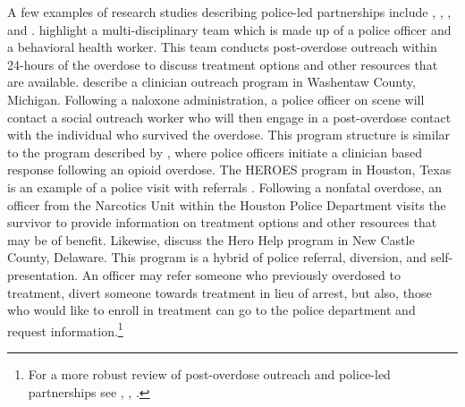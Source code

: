 A few examples of research studies describing police-led partnerships include \textcite{botieri_guide_2016}, \textcite{dahlem_recovery_2021}, \textcite{donnelly_law_2022}, and \textcite{yatsco_alternatives_2020}. \textcite{botieri_guide_2016} highlight a multi-disciplinary team which is made up of a police officer and a behavioral health worker. This team conducts post-overdose outreach within 24-hours of the overdose to discuss treatment options and other resources that are available. \textcite{dahlem_recovery_2021} describe a clinician outreach program in Washentaw County, Michigan. Following a naloxone administration, a police officer on scene will contact a social outreach worker who will then engage in a post-overdose contact with the individual who survived the overdose. This program structure is similar to the program described by \textcite{wagner_training_2016}, where police officers initiate a clinician based response following an opioid overdose.  The HEROES program in Houston, Texas is an example of a police visit with referrals \parencite{yatsco_alternatives_2020}. Following a nonfatal overdose, an officer from the Narcotics Unit within the Houston Police Department visits the survivor to provide information on treatment options and other resources that may be of benefit. Likewise, \textcite{donnelly_law_2022} discuss the Hero Help program in New Castle County, Delaware. This program is a hybrid of police referral, diversion, and self-presentation. An officer may refer someone who previously overdosed to treatment, divert someone towards treatment in lieu of arrest, but also, those who would like to enroll in treatment can go to the police department and request information.\footnote{For a more robust review of post-overdose outreach and police-led partnerships see \textcite{bagley_scoping_2019}, \textcite{bailey_scoping_2023}, \textcite{yatsco_developing_2020}.}

